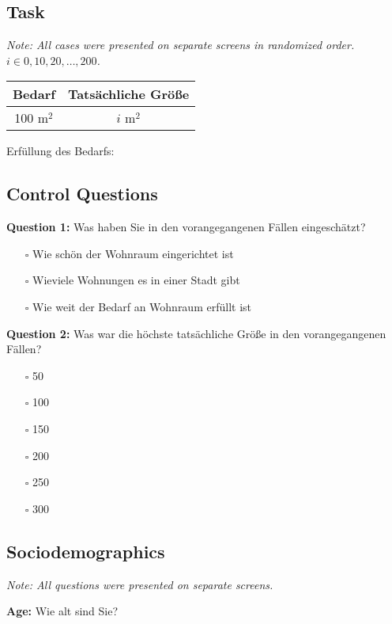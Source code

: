 \documentclass[egregdoesnotlikesansseriftitles]{scrartcl}
\begin{document}
\subsection*{Task}
\textit{Note: All cases were presented on separate screens in randomized order. $i \in {0, 10, 20, \ldots, 200}$.}

\vspace{1em}
\begin{tabular}{cc}\hline
   Bedarf      & Tatsächliche Größe   \\\hline\hline
   100 m$^2$   & $i$ m$^2$            \\\hline
\end{tabular}

\vspace{1em}
Erfüllung des Bedarfs:


\subsection*{Control Questions}
\noindent\textbf{Question 1:} Was haben Sie in den vorangegangenen Fällen eingeschätzt?
\begin{itemize}
   \item[$\square$] Wie schön der Wohnraum eingerichtet ist
   \item[$\square$] Wieviele Wohnungen es in einer Stadt gibt
   \item[$\square$] Wie weit der Bedarf an Wohnraum erfüllt ist
\end{itemize}

\vspace{1em}
\noindent\textbf{Question 2:} Was war die höchste tatsächliche Größe in den vorangegangenen Fällen?
\begin{itemize}
   \item[$\square$] 50
   \item[$\square$] 100
   \item[$\square$] 150
   \item[$\square$] 200
   \item[$\square$] 250
   \item[$\square$] 300
\end{itemize}


\subsection*{Sociodemographics}
\textit{Note: All questions were presented on separate screens.}

\vspace{1em}
\noindent\textbf{Age:} Wie alt sind Sie?
\end{document}

